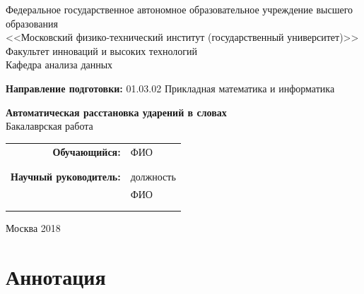 \documentclass[14pt, a4paper, russian]{extreport}
\begin{document}
\begin{center}
\hfill \break
\small{Федеральное государственное автономное образовательное учреждение \linebreak 
высшего образования}\\ 
\small{<<Московский физико-технический институт (государственный университет)>>}\\
\hfill \break
\small{Факультет инноваций и высоких технологий}\\
\small{Кафедра анализа данных}\\
\end{center}
\small{\textbf{Направление подготовки:} 01.03.02 Прикладная математика и информатика}\\
\hfill \break
\hfill \break
\hfill \break
\hfill \break
\begin{center}
\normalsize{\textbf{Автоматическая расстановка ударений в словах}}\\
\small{Бакалаврская работа}\\
\hfill \break
\hfill \break
\end{center}
 
\hfill \break
 
\begin{flushright}
\small{ 
\begin{tabular}{rl}
\textbf{Обучающийся:} & ФИО \\
 & \underline{\hspace{3cm}} \\\\
\textbf{Научный руководитель:} & должность\\
            & ФИО \\
 & \underline{\hspace{3cm}} \\\\
\end{tabular}
}
\end{flushright}

\hfill \break
\hfill \break
\hfill \break
\hfill \break
\begin{center} Москва 2018 \end{center}
\thispagestyle{empty} %
 
 
\newpage
\chapter*{Аннотация}
\end{document}
